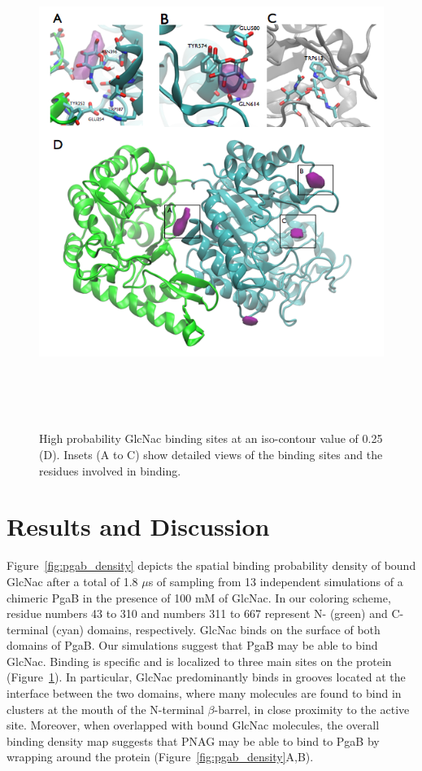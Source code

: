 \begin{figure}[pgab_binding_sites]
\centering
\includegraphics[height=6.29in, width=6.12in]{figures/results4/figure_pgab_binding_sites.png}
\caption[GlcNac binding sites]{High probability GlcNac binding sites at an iso-contour value of 0.25 (D). Insets (A to C) show detailed views of the binding sites and the residues involved in binding.}
\label{fig:pgab_binding_sites}
\end{figure}

\section{Results and Discussion}
Figure~\ref{fig:pgab_density} depicts the spatial binding probability density of bound GlcNac after a total of 1.8 $\mu$s of sampling from 13 independent simulations of a chimeric PgaB in the presence of 100 mM of GlcNac. In our coloring scheme, residue numbers 43 to 310 and numbers 311 to 667 represent N- (green) and C-terminal (cyan) domains, respectively. GlcNac binds on the surface of both domains of PgaB. Our simulations suggest that PgaB may be able to bind GlcNac. Binding is specific and is localized to three main sites on the protein (Figure~\ref{fig:pgab_binding_sites}). In particular, GlcNac predominantly binds in grooves located at the interface between the two domains, where many molecules are found to bind in clusters at the mouth of the N-terminal $\beta$-barrel, in close proximity to the active site.  Moreover, when overlapped with bound GlcNac molecules, the overall binding density map suggests that PNAG may be able to bind to PgaB by wrapping around the protein (Figure~\ref{fig:pgab_density}A,B).

